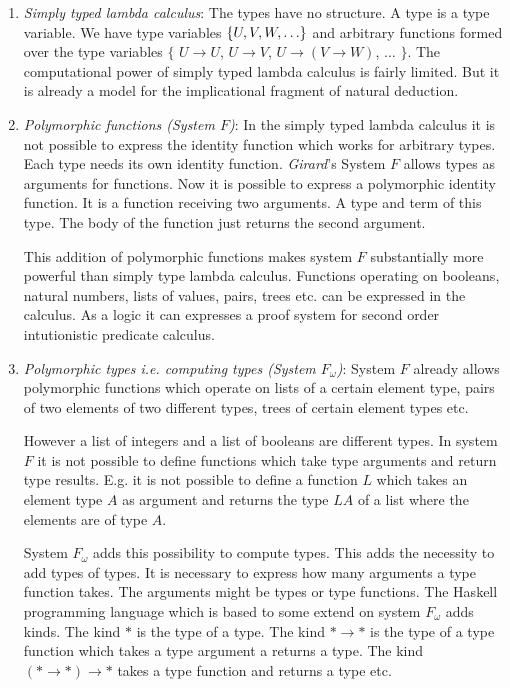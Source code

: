 \begin{enumerate}

\item \emph{Simply typed lambda calculus}:
    The types have no structure. A type is a type variable. We have type
    variables ${\{U, V, W, \ldots\}}$ and arbitrary functions formed over
    the type variables $\{$ $U \to U$, $U \to V$, $U \to (V \to W)$,
    $\ldots$ $\}$. The computational power of simply typed lambda calculus
    is fairly limited. But it is already a model for the implicational
    fragment of natural deduction.

\item \emph{Polymorphic functions (System $F$)}:
    In the simply typed lambda calculus it is not possible to express the
    identity function which works for arbitrary types. Each type needs its
    own identity function.  \emph{Girard}'s System $F$ allows types as
    arguments for functions. Now it is possible to express a polymorphic
    identity function. It is a function receiving two arguments. A type and
    term of this type. The body of the function just returns the second
    argument.

    This addition of polymorphic functions makes system $F$ substantially more
        powerful than simply type lambda calculus. Functions operating on
        booleans, natural numbers, lists of values, pairs, trees etc. can be
        expressed in the calculus. As a logic it can expresses a proof system
        for second order intutionistic predicate calculus.


\item \emph{Polymorphic types i.e. computing types (System $F_\omega$)}:
    System $F$ already allows polymorphic functions which operate on lists of a
        certain element type, pairs of two elements of two different types,
        trees of certain element types etc.

    However a list of integers and a list of booleans are different types. In
        system $F$ it is not possible to define functions which take type
        arguments and return type results. E.g. it is not possible to define a
        function $L$ which takes an element type $A$ as argument and returns the
        type $L A$ of a list where the elements are of type $A$.


    System $F_\omega$ adds this possibility to compute types. This adds the
        necessity to add types of types. It is necessary to express how many
        arguments a type function takes. The arguments might be types or type
        functions. The Haskell programming language which is based to some
        extend on system $F_\omega$ adds kinds. The kind $*$ is the type of a
        type. The kind $* \to *$ is the type of a type function which takes a
        type argument a returns a type. The kind $(* \to *) \to *$ takes a type
        function and returns a type etc.


\end{enumerate}
